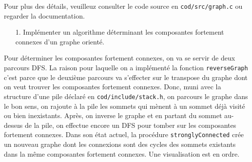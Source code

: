 \documentclass[10pt]{article} %
\begin{document}
Pour plus des détails, veuilleuz consulter le code source en \texttt{cod/src/graph.c} ou regarder la documentation.

\vspace{.5cm}
\noindent {} 

\begin{itemize}
    \item [1.] Implémenter un algorithme déterminant les composantes fortement connexes d'un graphe orienté.
\end{itemize}

Pour déterminer les composantes fortement connexes, on va se servir de deux parcours DFS. La raison pour laquelle on a implémenté la fonction
\texttt{reverseGraph} c'est parce que le deuxième parcours va s'effecter sur le transpose du graphe dont on veut trouver les composantes fortement connexes. Donc,
muni avec la structure d'une pile déclaré en \texttt{cod/include/stack.h}, on parcours le graphe dans le bon sens, on rajoute à la pile les sommets qui mènent à un
sommet déjà visité ou bien inexistants. Après, on inverse le graphe et en partant du sommet au-dessus de la pile, on effectue encore un DFS pour tomber sur les composantes fortement
connexes. Dans son état actuel, la procédure \texttt{stronglyConnected} crée un nouveau graphe dont les connexions sont des cycles des sommets existants dans la même composantes
fortement connexes. Une visualisation est en ordre.
\end{document}
